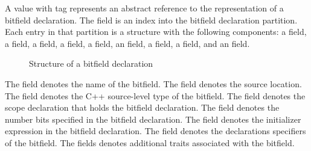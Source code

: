 A  value with tag  represents 
an abstract reference to the representation of a bitfield declaration.
The  field is an index into the bitfield declaration partition.
Each entry in that partition is a structure with the following components:
a  field, a  field, a  field, a  field,
a  field,
an  field, a  field,
a  field, and an  field.
%
\begin{figure}[H]
	\centering
	\caption{Structure of a bitfield declaration}
	\label{fig:ifc-bitfield-decl-structure}
\end{figure}
%
The  field denotes the name of the bitfield.
The  field denotes the source location.
The  field denotes the C++ source-level type of the bitfield.
The  field denotes the scope declaration that holds the bitfield declaration.  
The  field denotes the number bits specified in the bitfield declaration.
The  field denotes the initializer expression in the bitfield declaration.
The  field denotes the declarations specifiers of the bitfield.
The  fields denotes additional traits associated with the bitfield.


\subsection{}
\label{sec:ifc:DeclSort:Scope}

